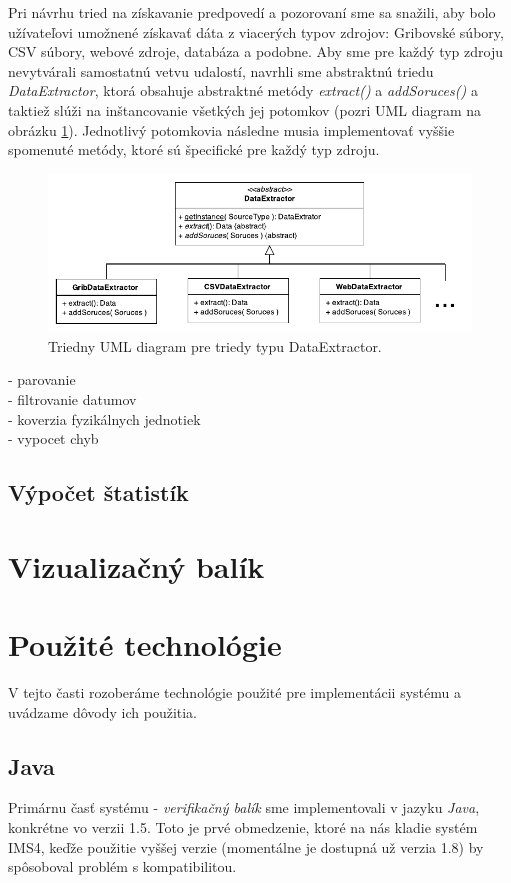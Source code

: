 Pri návrhu tried na získavanie predpovedí a pozorovaní sme sa snažili, aby bolo užívateľovi umožnené získavať dáta z viacerých typov zdrojov: Gribovské súbory, CSV súbory, webové zdroje, databáza a podobne. Aby sme pre každý typ zdroju nevytvárali samostatnú vetvu udalostí, navrhli sme abstraktnú triedu \textit{DataExtractor}, ktorá obsahuje abstraktné metódy \textit{extract()} a \textit{addSoruces()} a taktiež slúži na inštancovanie všetkých jej potomkov (pozri UML diagram na obrázku \ref{fig:dataextractor}). Jednotlivý potomkovia následne musia implementovať vyššie spomenuté metódy, ktoré sú špecifické pre každý typ zdroju.

\begin{figure}
	\centering
	\includegraphics[width = 5.5in]{dataextractor}
	\caption{Triedny UML diagram pre triedy typu DataExtractor.}
	\label{fig:dataextractor} 
\end{figure}

- parovanie \\
- filtrovanie datumov \\
- koverzia fyzikálnych jednotiek \\
- vypocet chyb 

\subsection{Výpočet štatistík}


\section{Vizualizačný balík}


\section{Použité technológie}
V tejto časti rozoberáme technológie použité pre implementácii systému a uvádzame dôvody ich použitia.

\subsection{Java}
Primárnu časť systému - \textit{verifikačný balík} sme implementovali v jazyku \textit{Java}, konkrétne vo verzii 1.5. Toto je prvé obmedzenie, ktoré na nás kladie systém IMS4, keďže použitie vyššej verzie (momentálne je dostupná už verzia 1.8) by spôsoboval problém s kompatibilitou.

